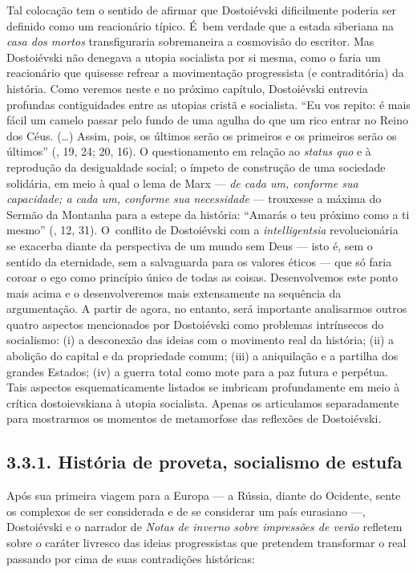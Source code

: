Tal colocação tem o sentido de afirmar que Dostoiévski dificilmente
poderia ser definido como um reacionário típico. É~bem verdade que a
estada siberiana na \emph{casa dos mortos} transfiguraria sobremaneira a
cosmovisão do escritor. Mas Dostoiévski não denegava a utopia socialista
por si mesma, como o faria um reacionário que quisesse refrear a
movimentação progressista (e contraditória) da história. Como veremos
neste e no próximo capítulo, Dostoiévski entrevia profundas
contiguidades entre as utopias cristã e socialista. ``Eu vos repito: é
mais fácil um camelo passar pelo fundo de uma agulha do que um rico
entrar no Reino dos Céus. (\ldots) Assim, pois, os últimos serão os
primeiros e os primeiros serão os últimos'' (, 19, 24; 20, 16). O
questionamento em relação ao \emph{status quo} e à reprodução da
desigualdade social; o ímpeto de construção de uma sociedade solidária,
em meio à qual o lema de Marx --- \emph{de cada um, conforme sua
capacidade; a cada um, conforme sua necessidade} --- trouxesse a máxima
do Sermão da Montanha para a estepe da história: ``Amarás o teu próximo
como a ti mesmo'' (, 12, 31). O~conflito de Dostoiévski com a
\emph{intelligentsia} revolucionária se exacerba diante da perspectiva
de um mundo sem Deus --- isto é, sem o sentido da eternidade, sem a
salvaguarda para os valores éticos --- que só faria coroar o ego como
princípio único de todas as coisas. Desenvolvemos este ponto mais acima
e o desenvolveremos mais extensamente na sequência da argumentação. A
partir de agora, no entanto, será importante analisarmos outros quatro
aspectos mencionados por Dostoiévski como problemas intrínsecos do
socialismo: (i) a desconexão das ideias com o movimento real da
história; (ii) a abolição do capital e da propriedade comum; (iii) a
aniquilação e a partilha dos grandes Estados; (iv) a guerra total como
mote para a paz futura e perpétua. Tais aspectos esquematicamente
listados se imbricam profundamente em meio à crítica dostoievskiana à
utopia socialista. Apenas os articulamos separadamente para mostrarmos
os momentos de metamorfose das reflexões de Dostoiévski.

\subsection{3.3.1. História de proveta, socialismo de estufa}

Após sua primeira viagem para a Europa --- a Rússia, diante do Ocidente,
sente os complexos de ser considerada e de se considerar um país
eurasiano ---, Dostoiévski e o narrador de \emph{Notas de inverno sobre
impressões de verão} refletem sobre o caráter livresco das ideias
progressistas que pretendem transformar o real passando por cima de suas
contradições históricas:

